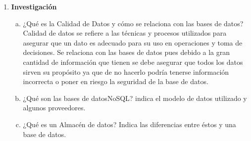 \documentclass[letterpaper,11pt]{article}
\begin{document}
\begin{enumerate}
\begin{enumerate}[a. ]
    \end{enumerate}

    \item \textbf{Investigación}
    \begin{enumerate}[a)]

        \item ¿Qué es la Calidad de Datos y cómo se relaciona con las bases de datos?\\
	Calidad de datos se refiere a las técnicas y procesos utilizados para asegurar que un dato es adecuado para su uso en operaciones y toma de decisiones. Se relaciona con las bases de datos pues debido a la gran cantidad de información que tienen se debe asegurar que todos los datos sirven su propósito ya que de no hacerlo podría tenerse información incorrecta o poner en riesgo la seguridad de la base de datos.

        \item ¿Qué son las bases de datosNoSQL? indica el modelo de datos utilizado y algunos proveedores.

        \item ¿Qué es un Almacén de datos? Indica las diferencias entre éstos y una base de datos.

    \end{enumerate}
\end{enumerate}
\end{document}
